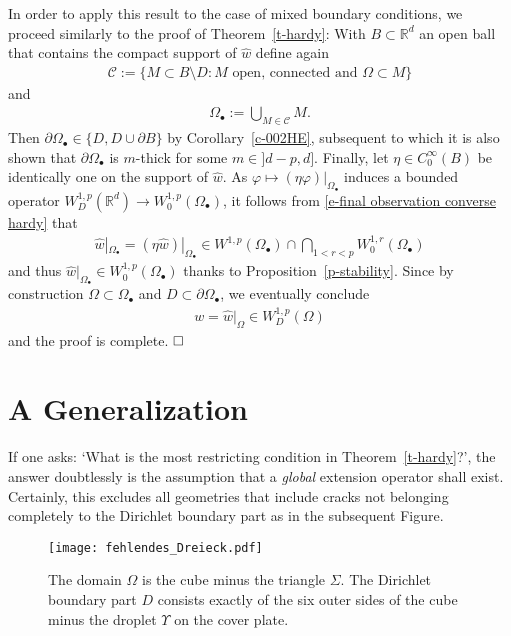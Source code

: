 \documentclass[10pt,leqno]{amsart}
\theoremstyle{definition}
\numberwithin{equation}{section}
\begin{document}
In order to apply this result to the case of mixed boundary conditions, we
proceed similarly to the proof of Theorem~\ref{t-hardy}: With $B \subset {{\mathbb R}}^d$ 
an open ball that contains the compact support of $\widehat{w}$ define again
\begin{align*}
 \mathcal C := \{ M \subset B \setminus D : M \text{ open, connected
	and } \Omega \subset M \}
\end{align*}
and
\begin{align*}
 \Omega_\bullet :=
	\bigcup_{M \in \mathcal C} M.
\end{align*}
Then $\partial \Omega_\bullet \in \{D, D \cup \partial B\}$ by
Corollary~\ref{c-002HE}, subsequent to which it is also shown that $\partial
\Omega_\bullet$ is $m$-thick for some $m \in {]d-p,d]}$. Finally, let $\eta \in
C_0^\infty(B)$ be identically one on the support of $\widehat{w}$. As
$\varphi \mapsto (\eta \varphi)|_{\Omega_\bullet}$ induces a bounded
operator $W_D^{1,p}({{\mathbb R}}^d) \to W_0^{1,p}(\Omega_\bullet)$, it follows from
\eqref{e-final observation converse hardy} that
\begin{align*}
  \widehat{w}|_{\Omega_\bullet} = (\eta \widehat{w})|_{\Omega_\bullet} \in
W^{1,p}(\Omega_\bullet) \cap \bigcap_{1<r<p} W_0^{1,r}(\Omega_\bullet)
\end{align*}
and thus $\widehat{w}|_{\Omega_\bullet} \in W_0^{1,p}(\Omega_\bullet)$ thanks to
Proposition~\ref{p-stability}. Since by construction $\Omega \subset
\Omega_\bullet$  and $D \subset \partial \Omega_\bullet$, we eventually conclude
\begin{align*}
 w = \widehat{w}|_\Omega \in W_D^{1,p}(\Omega)
\end{align*}
and the proof is complete. $\hfill \square$

\section{A Generalization} \label{sec-general}
\noindent If one asks: `What is the most restricting condition in
Theorem~\ref{t-hardy}?', the answer doubtlessly is the assumption that a
\emph{global} extension operator shall exist. Certainly, this excludes all
geometries that include cracks not belonging completely to the Dirichlet
boundary part as in the subsequent Figure.
\begin{figure}[htbp]
\centerline{\texttt{[image: fehlendes\_Dreieck.pdf]}}
\caption{\label{fig-fehlendes_Dreieck} 
The domain $\Omega$ is the cube minus
 the triangle $\Sigma$. The Dirichlet boundary part $D$ consists exactly of the
 six outer sides of the cube minus the droplet $\Upsilon$ on the cover plate.}
\end{figure}
\end{document}
